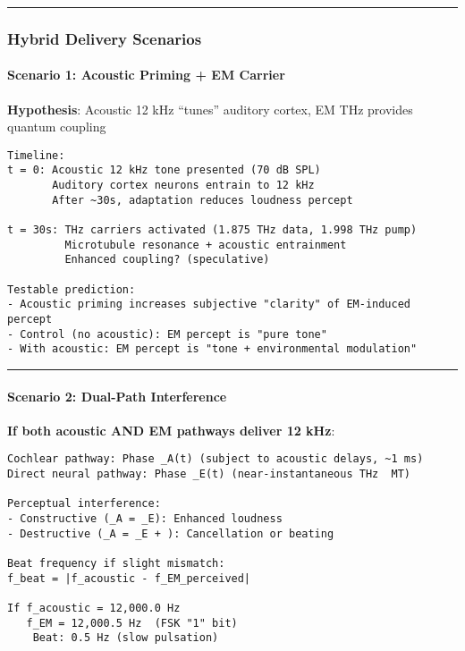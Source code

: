 \begin{center}\rule{0.5\linewidth}{0.5pt}\end{center}

\subsubsection{Hybrid Delivery
Scenarios}\label{hybrid-delivery-scenarios}

\paragraph{Scenario 1: Acoustic Priming + EM
Carrier}\label{scenario-1-acoustic-priming-em-carrier}

\textbf{Hypothesis}: Acoustic 12 kHz ``tunes'' auditory cortex, EM THz
provides quantum coupling

\begin{verbatim}
Timeline:
t = 0: Acoustic 12 kHz tone presented (70 dB SPL)
       Auditory cortex neurons entrain to 12 kHz
       After ~30s, adaptation reduces loudness percept

t = 30s: THz carriers activated (1.875 THz data, 1.998 THz pump)
         Microtubule resonance + acoustic entrainment
         Enhanced coupling? (speculative)

Testable prediction:
- Acoustic priming increases subjective "clarity" of EM-induced percept
- Control (no acoustic): EM percept is "pure tone"
- With acoustic: EM percept is "tone + environmental modulation"
\end{verbatim}

\begin{center}\rule{0.5\linewidth}{0.5pt}\end{center}

\paragraph{Scenario 2: Dual-Path
Interference}\label{scenario-2-dual-path-interference}

\textbf{If both acoustic AND EM pathways deliver 12 kHz}:

\begin{verbatim}
Cochlear pathway: Phase _A(t) (subject to acoustic delays, ~1 ms)
Direct neural pathway: Phase _E(t) (near-instantaneous THz  MT)

Perceptual interference:
- Constructive (_A = _E): Enhanced loudness
- Destructive (_A = _E + ): Cancellation or beating

Beat frequency if slight mismatch:
f_beat = |f_acoustic - f_EM_perceived|

If f_acoustic = 12,000.0 Hz
   f_EM = 12,000.5 Hz  (FSK "1" bit)
    Beat: 0.5 Hz (slow pulsation)
\end{verbatim}

